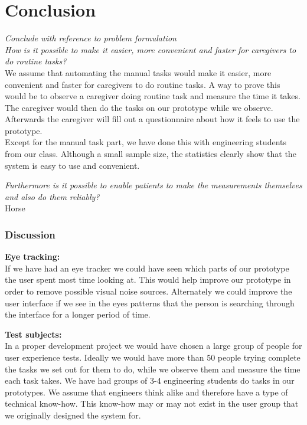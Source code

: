 \chapter{Conclusion}

\textit{Conclude with reference to problem formulation}\\

\textit{How is it possible to make it easier, more convenient and faster for caregivers to do routine tasks?}\\
We assume that automating the manual tasks would make it easier, more convenient and faster for caregivers to do routine tasks. A way to prove this would be to observe a caregiver doing routine task and measure the time it takes. The caregiver would then do the tasks on  our prototype while we observe. Afterwards the caregiver will  fill out  a questionnaire about how it feels to use the prototype. \\
Except for the manual task part, we have done this with engineering students from our class. Although a small sample size, the statistics clearly show that the system is easy to use and convenient. 

\textit{Furthermore is it possible to enable patients to make the measurements themselves and also do them reliably?}\\
Horse



\subsection{Discussion}
\textbf{Eye tracking:}\\
If we have had an eye tracker we could have seen which parts of our prototype the user spent most time looking at. This would help improve our prototype in order to remove possible visual noise sources. Alternately we could improve the user interface if we see in the eyes patterns that the person is searching through the interface for a longer period of time. 

\textbf{Test subjects:}\\
In a proper development project we would have chosen a large group of people for user experience tests. Ideally we would have more than 50 people trying complete the tasks we set  out for them to do, while we observe them and measure the time each task takes.  We have had groups  of 3-4 engineering students do tasks in our prototypes. We assume that engineers think alike and therefore have a type of technical know-how. This know-how may or may not exist in the user group that we originally designed the system for.